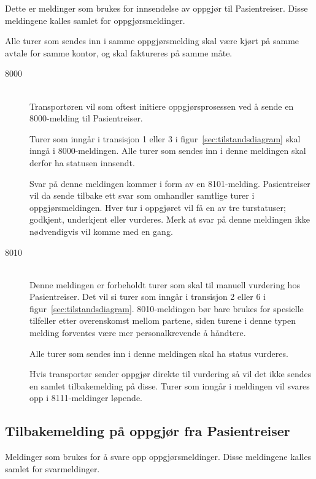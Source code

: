 \documentclass[a4paper,titlepage,norsk,11pt]{article}
\begin{document}
Dette er meldinger som brukes for innsendelse av oppgjør til Pasientreiser. Disse meldingene kalles samlet for oppgjørsmeldinger.

Alle turer som sendes inn i samme oppgjørsmelding skal være kjørt på samme avtale for samme kontor, og skal faktureres på samme måte.

\begin{description}

	\item[8000] \hfill \\
	Transportøren vil som oftest initiere oppgjørsprosessen ved å sende en 8000-melding til Pasientreiser.

	Turer som inngår i transisjon 1 eller 3 i figur~\ref{sec:tilstandsdiagram} skal inngå i 8000-meldingen.	Alle turer som sendes inn i denne meldingen skal derfor ha statusen innsendt.

	Svar på denne meldingen kommer i form av en 8101-melding. Pasientreiser vil da sende tilbake ett svar som omhandler samtlige turer i oppgjørsmeldingen. Hver tur i oppgjøret vil få en av tre turstatuser; godkjent, underkjent eller vurderes. Merk at svar på denne meldingen ikke nødvendigvis vil komme med en gang.

	\item[8010] \hfill \\
	Denne meldingen er forbeholdt turer som skal til manuell vurdering hos Pasientreiser. Det vil si turer som inngår i transisjon 2 eller 6 i figur~\ref{sec:tilstandsdiagram}. 8010-meldingen bør bare brukes for spesielle tilfeller etter overenskomst mellom partene, siden turene i denne typen melding forventes være mer personalkrevende å håndtere.

	Alle turer som sendes inn i denne meldingen skal ha status vurderes.

	Hvis transportør sender oppgjør direkte til vurdering så vil det ikke sendes en samlet tilbakemelding på disse. Turer som inngår i meldingen vil svares opp i 8111-meldinger løpende.

\end{description}

\subsection{Tilbakemelding på oppgjør fra Pasientreiser}

Meldinger som brukes for å svare opp oppgjørsmeldinger. Disse meldingene kalles samlet for svarmeldinger.
\end{document}
